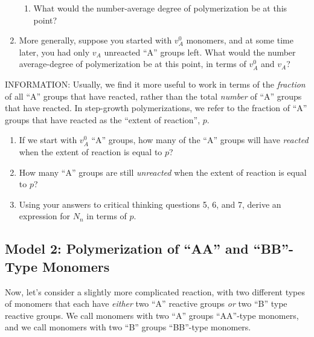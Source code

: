 \begin{enumerate}
\begin{enumerate}
				\item What would the number-average degree of polymerization be at this point?
			\end{enumerate}
			
		\item More generally, suppose you started with $v_A^0$ monomers, and at some time later, you had only $v_A$ unreacted ``A'' groups left.  What would the number average-degree of polymerization be at this point, in terms of $v_A^0$ and $v_A$?
		
		\vspace{1in}
		
	\end{enumerate}
	
	INFORMATION: Usually, we find it more useful to work in terms of the \emph{fraction} of all ``A'' groups that have reacted, rather than the total \emph{number} of ``A'' groups that have reacted.  In step-growth polymerizations, we refer to the fraction of ``A'' groups that have reacted as the ``extent of reaction'', $p$.
	
	\begin{enumerate}[resume]
		\item If we start with $v_A^0$ ``A'' groups, how many of the ``A'' groups will have \emph{reacted} when the extent of reaction is equal to $p$?
		
		\vspace{1in}
		
		\item How many ``A'' groups are still \emph{unreacted} when the extent of reaction is equal to $p$?
		
		\vspace{1in}
		
		\item Using your answers to critical thinking questions 5, 6, and 7, derive an expression for $N_n$ in terms of $p$.
		
		\vspace{1in}
		
	\end{enumerate}

\subsection{Model 2: Polymerization of ``AA'' and ``BB''-Type Monomers}

Now, let's consider a slightly more complicated reaction, with two different types of monomers that each have \emph{either} two ``A'' reactive groups \emph{or} two ``B'' type reactive groups.
We call monomers with two ``A'' groups ``AA''-type monomers, and we call monomers with two ``B'' groups ``BB''-type monomers.

